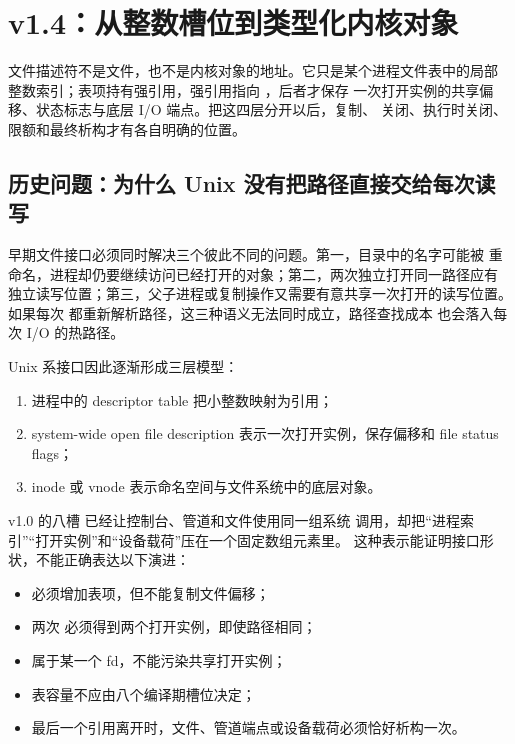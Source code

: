 \section{v1.4：从整数槽位到类型化内核对象}

\begin{keyidea}
文件描述符不是文件，也不是内核对象的地址。它只是某个进程文件表中的局部
整数索引；表项持有强引用，强引用指向 ，后者才保存
一次打开实例的共享偏移、状态标志与底层 I/O 端点。把这四层分开以后，复制、
关闭、执行时关闭、限额和最终析构才有各自明确的位置。
\end{keyidea}

\subsection{历史问题：为什么 Unix 没有把路径直接交给每次读写}

早期文件接口必须同时解决三个彼此不同的问题。第一，目录中的名字可能被
重命名，进程却仍要继续访问已经打开的对象；第二，两次独立打开同一路径应有
独立读写位置；第三，父子进程或复制操作又需要有意共享一次打开的读写位置。
如果每次  都重新解析路径，这三种语义无法同时成立，路径查找成本
也会落入每次 I/O 的热路径。

Unix 系接口因此逐渐形成三层模型：

\begin{enumerate}
  \item 进程中的 descriptor table 把小整数映射为引用；
  \item system-wide open file description 表示一次打开实例，保存偏移和
        file status flags；
  \item inode 或 vnode 表示命名空间与文件系统中的底层对象。
\end{enumerate}

v1.0 的八槽  已经让控制台、管道和文件使用同一组系统
调用，却把“进程索引”“打开实例”和“设备载荷”压在一个固定数组元素里。
这种表示能证明接口形状，不能正确表达以下演进：

\begin{itemize}
  \item {} 必须增加表项，但不能复制文件偏移；
  \item 两次  必须得到两个打开实例，即使路径相同；
  \item {} 属于某一个 fd，不能污染共享打开实例；
  \item 表容量不应由八个编译期槽位决定；
  \item 最后一个引用离开时，文件、管道端点或设备载荷必须恰好析构一次。
\end{itemize}

